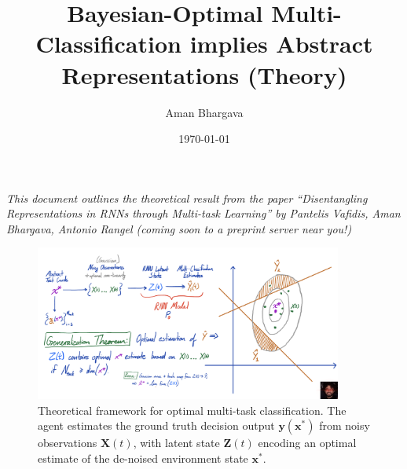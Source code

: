 \documentclass[12pt]{article}
\begin{document}
\title{Bayesian-Optimal Multi-Classification implies Abstract Representations (Theory)}

\author{Aman Bhargava}

\date{\today}
\maketitle

\textit{This document outlines the theoretical result from the paper ``Disentangling Representations in RNNs through Multi-task Learning'' by Pantelis Vafidis, Aman Bhargava, Antonio Rangel (coming soon to a preprint server near you!)} \\

\begin{figure}[h! tbp]
	\centering 
	\includegraphics[width=0.9\textwidth]{media/min_reps_fig_1.png}
	\caption{Theoretical framework for optimal multi-task classification. The agent estimates the ground truth decision output $\mathbf y(\mathbf x^*)$ from noisy observations $\mathbf X(t)$, with latent state $\mathbf Z(t)$ encoding an optimal estimate of the de-noised environment state $\mathbf x^*$.}
	\label{fig:1}
\end{figure}
\end{document}
